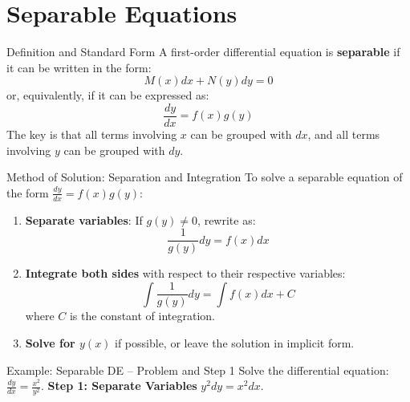 \documentclass[10pt,aspectratio=169]{beamer}
\begin{document}
\section{Separable Equations}

\begin{frame}{Definition and Standard Form}
    A first-order differential equation is \textbf{separable} if it can be written in the form:
    \begin{equation}
        M(x)dx + N(y)dy = 0
        \label{eq:separable_form1}
    \end{equation}
    or, equivalently, if it can be expressed as:
    \begin{equation}
        \frac{dy}{dx} = f(x)g(y)
        \label{eq:separable_form2}
    \end{equation}
    The key is that all terms involving $x$ can be grouped with $dx$, and all terms involving $y$ can be grouped with $dy$.
\end{frame}

\begin{frame}{Method of Solution: Separation and Integration}
    To solve a separable equation of the form $\frac{dy}{dx} = f(x)g(y)$:
    \begin{enumerate}
        \item \textbf{Separate variables}: If $g(y) \neq 0$, rewrite as:
        \begin{equation}
            \frac{1}{g(y)}dy = f(x)dx
        \end{equation}
        \item \textbf{Integrate both sides} with respect to their respective variables:
        \begin{equation}
            \int \frac{1}{g(y)}dy = \int f(x)dx + C
            \label{eq:separable_solution}
        \end{equation}
        where $C$ is the constant of integration.
        \item \textbf{Solve for $y(x)$} if possible, or leave the solution in implicit form.
    \end{enumerate}
\end{frame}

\begin{frame}{Example: Separable DE -- Problem and Step 1}
    Solve the differential equation: $\frac{dy}{dx} = \frac{x^2}{y^2}$.
    \vspace{1em}
    \textbf{Step 1: Separate Variables}
    $y^2 dy = x^2 dx$.
\end{frame}
\end{document}
